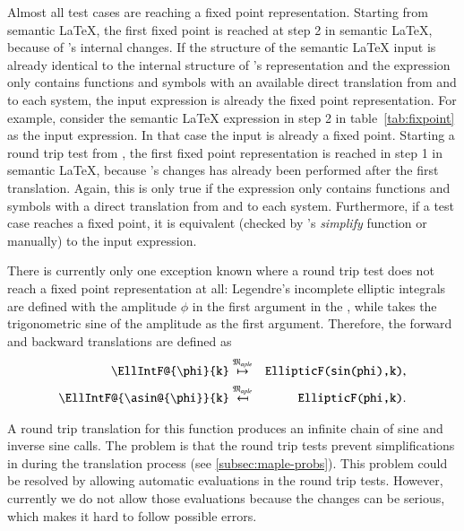 Almost all test cases are reaching a fixed point representation. Starting from semantic \LaTeX, the first fixed point is reached at step 2 in semantic \LaTeX, because of \Maple's internal changes. If the structure of the semantic \LaTeX{} input is already identical to the internal structure of \Maple's representation and the expression only contains functions and symbols with an available direct translation from and to each system, the input expression is already the fixed point representation. For example, consider the semantic \LaTeX{} expression in step 2 in table~\ref{tab:fixpoint} as the input expression. In that case the input is already a fixed point. Starting a round trip test from \Maple, the first fixed point representation is reached in step 1 in semantic \LaTeX, because \Maple's changes has already been performed after the first translation. Again, this is only true if the expression only contains functions and symbols with a direct translation from and to each system. Furthermore, if a test case reaches a fixed point, it is equivalent (checked by \Maple's \textit{simplify} function or manually) to the input expression.

There is currently only one exception known where a round trip test does not reach a fixed point representation at all: Legendre's incomplete elliptic integrals~\cite[(19.2.4-7)]{NIST:DLMF} are defined with the amplitude $\phi$ in the first argument in the \DLMF, while \Maple{} takes the trigonometric sine of the amplitude as the first argument. Therefore, the forward and backward translations are defined as
\begin{eqnarray}
\verb|\EllIntF@{\phi}{k}| & \overset{\langMaple}{\mapsto} & \verb|EllipticF(sin(phi),k)|,\\
\verb|\EllIntF@{\asin@{\phi}}{k}| & \overset{\langMaple}{\mapsfrom} & \verb|EllipticF(phi,k)|.
\end{eqnarray}

A round trip translation for this function produces an infinite chain of sine and inverse sine calls. The problem is that the round trip tests prevent simplifications in \Maple{} during the translation process (see \cref{subsec:maple-probs}). This problem could be resolved by allowing automatic evaluations in the round trip tests. However, currently we do not allow those evaluations because the changes can be serious, which makes it hard to follow possible errors.

